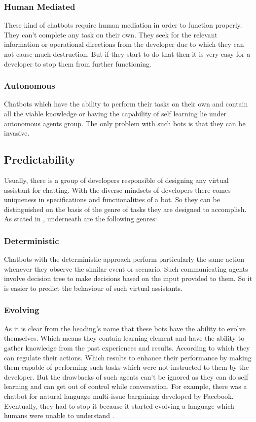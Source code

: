 \subsubsection*{Human Mediated}
These kind of chatbots require human mediation in order to function properly. They can't complete any task on their own. They seek for the relevant information or operational directions from the developer due to which they can not cause much destruction. But if they start to do that then it is very easy for a developer to stop them from further functioning. \cite{frameworkforunderstandingchatbots}

\subsubsection*{Autonomous}
Chatbots which have the ability to perform their tasks on their own and contain all the viable knowledge or having the capability of self learning lie under autonomous agents group. The only problem with such bots is that they can be invasive. \cite{frameworkforunderstandingchatbots}

\subsection{Predictability}
Usually, there is a group of developers responsible of designing any virtual assistant for chatting. With the diverse mindsets of developers there comes uniqueness in specifications and functionalities of a bot. So they can be distinguished on the basis of the genre of tasks they are designed to accomplish. As stated in \cite{frameworkforunderstandingchatbots}, underneath are the following genres:

\subsubsection*{Deterministic}
Chatbots with the deterministic approach perform particularly the same action whenever they observe the similar event or scenario. Such communicating agents involve decision tree to make decisions based on the input provided to them. So it is easier to predict the behaviour of such virtual assistants. 

\subsubsection*{Evolving}
As it is clear from the heading's name that these bots have the ability to evolve themselves. Which means they contain learning element and have the ability to gather knowledge from the past experiences and results. According to which they can regulate their actions. Which results to enhance their performance by making them capable of performing such tasks which were not instructed to them by the developer. But the drawbacks of such agents can't be ignored as they can do self learning and can get out of control while conversation. For example, there was a chatbot for natural language multi-issue bargaining developed by Facebook. Eventually, they had to stop it because it started evolving a language which humans were unable to understand \cite{fbshutdownbot}. 

